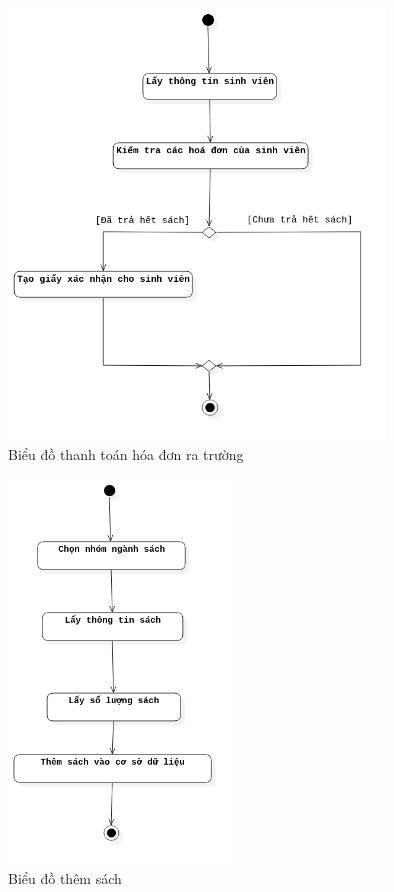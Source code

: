 \documentclass[12pt]{report}
\begin{document}
\begin{figure}[H]
\centering
\includegraphics[width=10cm]{figures/thanhtoanratruong.png}
\caption{Biểu đồ thanh toán hóa đơn ra trường}
\end{figure}

\begin{figure}[H]
\centering
\includegraphics[width=6cm]{figures/themsach.png}
\caption{Biểu đồ thêm sách}
\end{figure}
\end{document}
